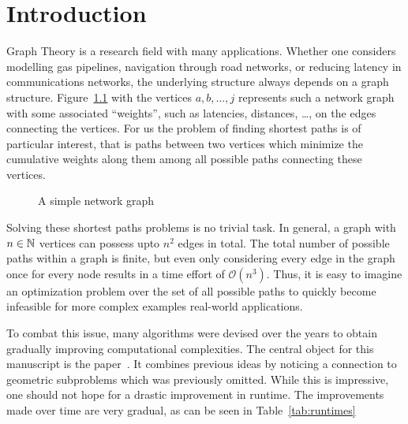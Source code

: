 \chapter{Introduction}

Graph Theory is a research field with many applications.
Whether one considers modelling gas pipelines, navigation through road networks, or reducing latency in communications networks, the underlying structure always depends on a graph structure.
Figure~\ref{fig:graph-network} with the vertices $a, b,  \dots, j$ represents such a network graph with some associated ``weights'', such as latencies, distances, \dots, on the edges connecting the vertices.
For us the problem of finding shortest paths is of particular interest, that is paths between two vertices which minimize the cumulative weights along them among all possible paths connecting these vertices.

\begin{figure}[ht]
    \centering
    \caption{A simple network graph\label{fig:graph-network}}
\end{figure}

Solving these shortest paths problems is no trivial task.
In general, a graph with $n \in \mathbb{N}$ vertices can possess upto $n^2$ edges in total.
The total number of possible paths within a graph is finite, but even only considering every edge in the graph once for every node results in a time effort of $\mathcal{O}\left( n^3 \right)$.
Thus, it is easy to imagine an optimization problem over the set of all possible paths to quickly become infeasible for more complex examples real-world applications.

To combat this issue, many algorithms were devised over the years to obtain gradually improving computational complexities.
The central object for this manuscript is the paper~\cite{Chan2007}.
It combines previous ideas by noticing a connection to geometric subproblems which was previously omitted.
While this is impressive, one should not hope for a drastic improvement in runtime.
The improvements made over time are very gradual, as can be seen in Table~\ref{tab:runtimes}

